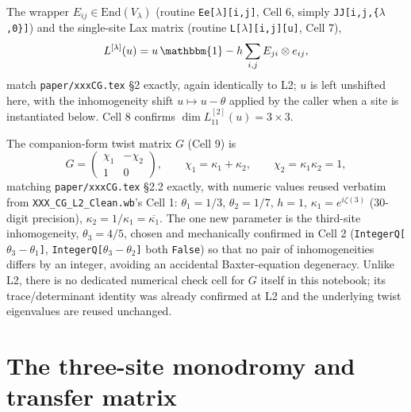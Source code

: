 \documentclass[11pt]{article}
\begin{document}
The wrapper $E_{ij}\in\mathrm{End}(V_\lambda)$ (routine \texttt{Ee[$\lambda$][i,j]}, Cell 6, simply
\texttt{JJ[i,j,\{$\lambda$,0\}]}) and the single-site Lax matrix (routine \texttt{L[$\lambda$][i,j][u]},
Cell 7),
\begin{equation}
  L^{[\lambda]}(u) = u\,\mathbbm{1} - h\sum_{i,j} E_{ji}\otimes e_{ij},
  \label{eq:Lax}
\end{equation}
match \texttt{paper/xxxCG.tex} \S2 exactly, again identically to L2; $u$ is left unshifted here, with
the inhomogeneity shift $u\mapsto u-\theta$ applied by the caller when a site is instantiated below.
Cell 8 confirms $\dim L^{[2]}_{11}(u)=3\times3$.

The companion-form twist matrix $G$ (Cell 9) is
\begin{equation}
  G = \begin{pmatrix} \chi_1 & -\chi_2 \\ 1 & 0 \end{pmatrix}, \qquad
  \chi_1=\kappa_1+\kappa_2, \qquad \chi_2=\kappa_1\kappa_2=1,
  \label{eq:G}
\end{equation}
matching \texttt{paper/xxxCG.tex} \S2.2 exactly, with numeric values reused verbatim from
\texttt{XXX\_CG\_L2\_Clean.wb}'s Cell 1: $\theta_1=1/3$, $\theta_2=1/7$, $h=1$,
$\kappa_1=e^{i\zeta(3)}$ (30-digit precision), $\kappa_2=1/\kappa_1=\overline{\kappa_1}$. The one new
parameter is the third-site inhomogeneity, $\theta_3=4/5$, chosen and mechanically confirmed in
Cell 2 (\texttt{IntegerQ[$\theta_3-\theta_1$]}, \texttt{IntegerQ[$\theta_3-\theta_2$]} both
\texttt{False}) so that no pair of inhomogeneities differs by an integer, avoiding an accidental
Baxter-equation degeneracy. Unlike L2, there is no dedicated numerical check cell for $G$ itself in
this notebook; its trace/determinant identity was already confirmed at L2 and the underlying twist
eigenvalues are reused unchanged.

\section{The three-site monodromy and transfer matrix}
\label{sec:twosite}
\end{document}
